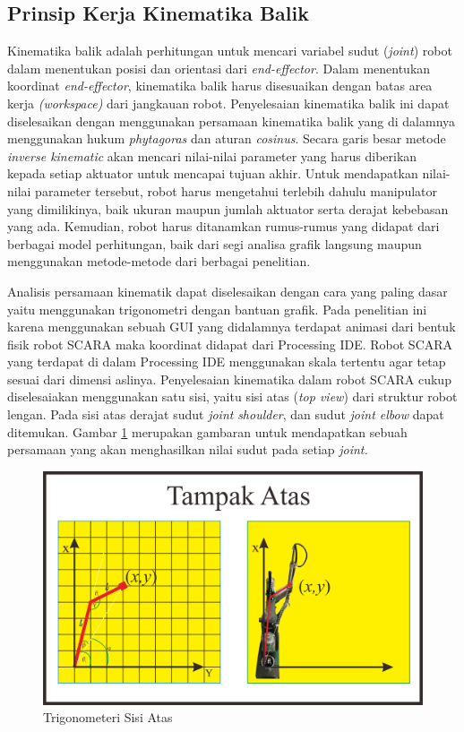 \subsection{Prinsip Kerja Kinematika Balik}
Kinematika balik adalah perhitungan untuk mencari variabel sudut (\textit{joint}) robot dalam menentukan posisi dan orientasi dari \textit{end-effector}. Dalam menentukan koordinat \textit{end-effector}, kinematika balik harus disesuaikan dengan batas area kerja \textit{(workspace)} dari jangkauan robot. Penyelesaian kinematika balik ini dapat diselesaikan dengan menggunakan persamaan kinematika balik yang di dalamnya menggunakan hukum \textit{phytagoras} dan aturan \textit{cosinus}. 
Secara garis besar metode \textit{inverse kinematic} akan mencari nilai-nilai parameter yang harus diberikan kepada setiap aktuator untuk mencapai tujuan akhir. Untuk mendapatkan nilai-nilai parameter tersebut, robot harus mengetahui terlebih dahulu manipulator yang dimilikinya, baik ukuran maupun jumlah aktuator serta derajat kebebasan yang ada. Kemudian, robot harus ditanamkan rumus-rumus yang didapat dari berbagai model perhitungan, baik dari segi analisa grafik langsung maupun menggunakan metode-metode dari berbagai penelitian. 

Analisis persamaan kinematik dapat diselesaikan dengan cara yang paling dasar yaitu menggunakan trigonometri dengan bantuan grafik. Pada penelitian ini karena menggunakan sebuah GUI yang didalamnya terdapat animasi dari bentuk fisik robot SCARA maka koordinat didapat dari Processing IDE. Robot SCARA yang terdapat di dalam Processing IDE menggunakan skala tertentu agar tetap sesuai dari dimensi aslinya. Penyelesaian kinematika dalam robot SCARA cukup diselesaiakan menggunakan satu sisi, yaitu sisi atas (\textit{top view}) dari struktur robot lengan. Pada sisi atas derajat sudut \textit{joint} \textit{shoulder}, dan sudut \textit{joint elbow} dapat ditemukan. Gambar \ref{pic.perskinematikabalik} merupakan gambaran untuk mendapatkan sebuah persamaan yang akan menghasilkan nilai sudut pada setiap \textit{joint.}
\begin{figure}[H]
	\centering
	\includegraphics[width=12cm]{gambar/scara_atas.png}
	\caption{Trigonometeri Sisi Atas}
	\label{pic.perskinematikabalik}
\end{figure}
 
